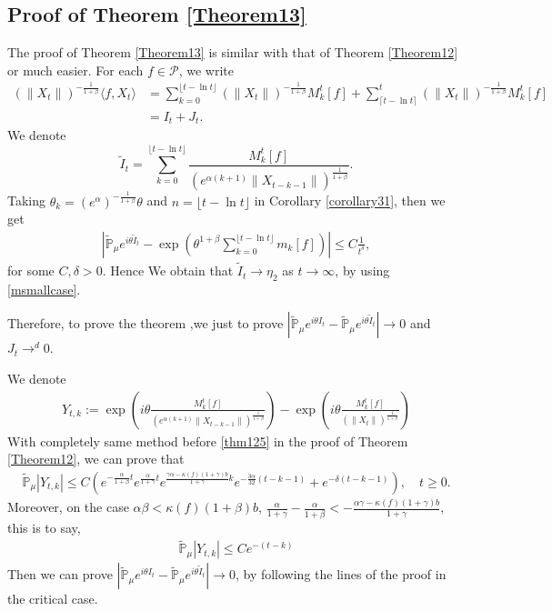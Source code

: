 \documentclass[12pt, a4paper]{amsart}
\theoremstyle{definition}
\numberwithin{equation}{section}
\begin{document}
\subsection{Proof of Theorem \ref{Theorem13}}
The proof of Theorem \ref{Theorem13} is similar with that of Theorem \ref{Theorem12} or much easier.
     For each $f\in \mathcal{P}$, we write
    \begin{align*}
        (\|X_t\|)^{-\frac{1}{1+\beta}}\langle f,X_t\rangle&=\sum_{k=0}^{\lfloor t-\ln t \rfloor} (\|X_t\|)^{-\frac{1}{1+\beta}}M_k^t[f]+\sum_{\lceil t-\ln t \rceil}^t (\|X_t\|)^{-\frac{1}{1+\beta}}M_k^t[f]\\
        &=I_t+J_t.
    \end{align*}
    We denote
    $$\tilde{I}_t=\sum_{k=0}^{\lfloor t-\ln t \rfloor}\frac{M_k^t[f]}{( e^{\alpha(k+1)}\|X_{t-k-1}\|)^{\frac{1}{1+\beta}}}.$$
    Taking $\theta_k=( e^{\alpha})^{-\frac{1}{1+\beta}} \theta $ and $n={\lfloor t-\ln t \rfloor}$ in Corollary \ref{corollary31}, then we get
    \begin{align*}
        \left|\mathbb{\tilde{P}}_{\mu}e^{i\theta\tilde{I}_t}-\exp\left(\theta^{1+\beta}\sum_{k=0}^{\lfloor t-\ln t \rfloor}m_k[f]\right)\right|\leq C \frac{1}{t^{\delta}},
    \end{align*}
    for some $C,\delta>0$. Hence We obtain that $\tilde{I}_t\rightarrow\eta_2$ as $t\rightarrow \infty$, by using  \eqref{msmallcase}.

    Therefore, to prove the theorem ,we just to prove $\left|\mathbb{\tilde{P}}_{\mu}e^{i\theta I_t}-\mathbb{\tilde{P}}_{\mu}e^{i\theta\tilde{I}_t}\right|\rightarrow 0$ and $J_t\rightarrow^d 0$.

    We denote
    \begin{align*}
        Y_{t,k}:=\exp\left(i\theta\frac{M_k^t[f]}{( e^{\alpha(k+1)}\|X_{t-k-1}\|)^{\frac{1}{1+\beta}}}\right)-\exp\left(i\theta\frac{M_k^t[f]}{\left(\|X_t\|\right)^{\frac{1}{1+\beta}}}\right)
    \end{align*}
With completely same method before \eqref{thm125} in the proof of Theorem \ref{Theorem12}, we can prove that
\begin{align*}
    \mathbb{\tilde{P}}_{\mu}|Y_{t,k}|\leq C( e^{-\frac{\alpha}{1+\beta}t}e^{\frac{\alpha}{1+\gamma}t}e^{\frac{\gamma \alpha-\kappa(f)(1+\gamma)b}{1+\gamma}k}e^{-\frac{3\alpha}{32}(t-k-1)}+ e^{-\delta(t-k-1)}), \quad t\geq 0.
\end{align*}
Moreover, on the case $\alpha\beta<\kappa(f)(1+\beta)b$,  $\frac{\alpha}{1+\gamma}-\frac{\alpha}{1+\beta}< - \frac{\alpha\gamma-\kappa(f)(1+\gamma)b}{1+\gamma}$, this is to say,
\begin{align*}
    \mathbb{\tilde{P}}_{\mu}|Y_{t,k}|\leq C e^{-(t-k)}
\end{align*}
Then we can prove $\left|\mathbb{\tilde{P}}_{\mu}e^{i\theta I_t}-\mathbb{\tilde{P}}_{\mu}e^{i\theta\tilde{I}_t}\right|\rightarrow 0$, by following the lines of the proof in the critical case.
\end{document}
